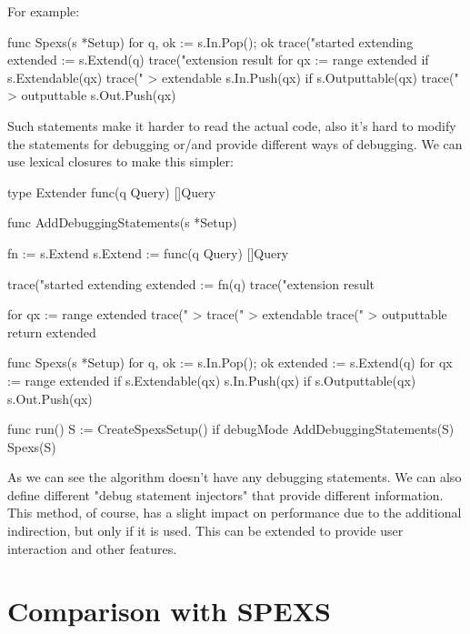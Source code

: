 For example:

\begin{file}
func Spexs(s *Setup) {
    for q, ok := s.In.Pop(); ok {
        trace("started extending %
        extended := s.Extend(q)
        trace("extension result %
        for qx := range extended {
            if s.Extendable(qx) {
                trace(" > extendable %
                s.In.Push(qx)
                if s.Outputtable(qx) {
                    trace(" > outputtable %
                    s.Out.Push(qx)
                }
            }
        }
    }
}
\end{file}

Such statements make it harder to read the actual code, also it's hard to modify the statements for debugging or/and provide different ways of debugging. We can use lexical closures to make this simpler:

\begin{file}
type Extender func(q Query) []Query

func AddDebuggingStatements(s *Setup) {
    fn := s.Extend
    s.Extend := func(q Query) []Query {
        trace("started extending %
        extended := fn(q)
        trace("extension result %
        
        for qx := range extended {
            trace(" > %
            trace(" > extendable %
            trace(" > outputtable %
        }
        return extended
    }
}

func Spexs(s *Setup) {
    for q, ok := s.In.Pop(); ok {
        extended := s.Extend(q)
        for qx := range extended {
            if s.Extendable(qx) {
                s.In.Push(qx)
                if s.Outputtable(qx) {
                    s.Out.Push(qx)
                }
            }
        }
    }
}

func run(){
    S := CreateSpexsSetup()
    if debugMode {
        AddDebuggingStatements(S)
    }
    Spexs(S)
}
\end{file}

As we can see the algorithm doesn't have any debugging statements. We can also define different "debug statement injectors" that provide different information. This method, of course, has a slight impact on performance due to the additional indirection, but only if it is used. This can be extended to provide user interaction and other features.

\section{Comparison with SPEXS}

